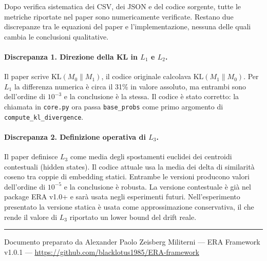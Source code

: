 \documentclass[11pt,a4paper]{article}
\newcommand{\M}[1]{M_{#1}}
\begin{document}
Dopo verifica sistematica dei CSV, dei JSON e del codice sorgente,
tutte le metriche riportate nel paper sono numericamente verificate.
Restano due discrepanze tra le equazioni del paper e l'implementazione,
nessuna delle quali cambia le conclusioni qualitative.

\paragraph{Discrepanza 1. Direzione della KL in $L_1$ e $L_2$.}
Il paper scrive $\mathrm{KL}(\M{0} \| \M{1})$, il codice originale
calcolava $\mathrm{KL}(\M{1} \| \M{0})$.
Per $L_1$ la differenza numerica è circa il 31\% in valore assoluto,
ma entrambi sono dell'ordine di $10^{-3}$ e la conclusione è la stessa.
Il codice è stato corretto: la chiamata in \texttt{core.py} ora passa
\texttt{base\_probs} come primo argomento di \texttt{compute\_kl\_divergence}.

\paragraph{Discrepanza 2. Definizione operativa di $L_3$.}
Il paper definisce $L_3$ come media degli spostamenti euclidei dei centroidi
contestuali (hidden states). Il codice attuale usa la media dei delta di similarità
coseno tra coppie di embedding statici. Entrambe le versioni producono valori
dell'ordine di $10^{-5}$ e la conclusione è robusta. La versione contestuale
è già nel package ERA v1.0+ e sarà usata negli esperimenti futuri.
Nell'esperimento presentato la versione statica è usata come approssimazione
conservativa, il che rende il valore di $L_3$ riportato un lower bound
del drift reale.

\vspace{16pt}
\hrule
\vspace{8pt}
{\small\color{gray}
Documento preparato da Alexander Paolo Zeisberg Militerni ---
ERA Framework v1.0.1 ---
\url{https://github.com/blacklotus1985/ERA-framework}}
\end{document}
